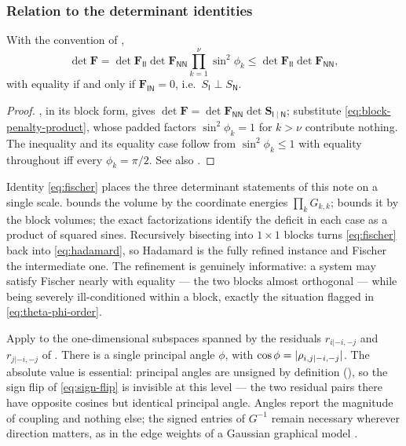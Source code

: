 \documentclass{IEEEtran}
\begin{document}
\subsubsection{Relation to the determinant identities}

\begin{corollary}
  \label{cor:fischer}
  With the convention of ,
  \begin{equation}
    \det \mathbf{F}
    = \det \mathbf{F}_{\mathsf{II}} \det \mathbf{F}_{\mathsf{NN}} \prod_{k=1}^{\nu}\sin^{2}\phi_{k}
    \le \det \mathbf{F}_{\mathsf{II}}\det \mathbf{F}_{\mathsf{NN}} ,
    \label{eq:fischer}
  \end{equation}
  with equality if and only if $\mathbf{F}_{\mathsf{IN}} = 0$, i.e.\ $S_{\mathsf{I}} \perp S_{\mathsf{N}}$.
\end{corollary}

\begin{proof}
  , in its block form, gives $\det\mathbf{F} = \det\mathbf{F}_{\mathsf{NN}}\det\mathbf{S}_{\mathsf{I}\mid\mathsf{N}}$; substitute \eqref{eq:block-penalty-product}, whose padded factors $\sin^{2}\phi_{k} = 1$ for $k > \nu$ contribute nothing. The inequality and its equality case follow from $\sin^{2}\phi_{k}\le 1$ with equality throughout iff every $\phi_{k}=\pi/2$. See also \cite[Sec.~7.8]{horn2013}.
\end{proof}

Identity \eqref{eq:fischer} places the three determinant statements of this note on a single scale.  bounds the volume by the coordinate energies $\prod_{k} G_{k,k}$;  bounds it by the block volumes; the exact factorizations identify the deficit in each case as a product of squared sines. Recursively bisecting into $1\times 1$ blocks turns \eqref{eq:fischer} back into \eqref{eq:hadamard}, so Hadamard is the fully refined instance and Fischer the intermediate one. The refinement is genuinely informative: a system may satisfy Fischer nearly with equality --- the two blocks almost orthogonal --- while being severely ill-conditioned within a block, exactly the situation flagged in \eqref{eq:theta-phi-order}.

\begin{remark}
  \label{rem:partial-as-angle}
  Apply  to the one-dimensional subspaces spanned by the residuals $r_{i|-i,-j}$ and $r_{j|-i,-j}$ of . There is a single principal angle $\phi$, with $\cos\phi = \lvert\rho_{i,j|-i,-j}\rvert$. The absolute value is essential: principal angles are unsigned by definition (), so the sign flip of \eqref{eq:sign-flip} is invisible at this level --- the two residual pairs there have opposite cosines but identical principal angle. Angles report the magnitude of coupling and nothing else; the signed entries of $G^{-1}$ remain necessary wherever direction matters, as in the edge weights of a Gaussian graphical model \cite{lauritzen1996}.
\end{remark}
\end{document}
